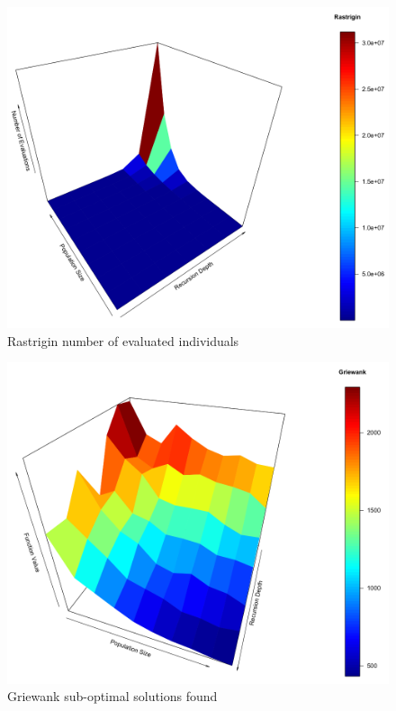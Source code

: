 \documentclass[graybox]{styles/svmult}
\begin{document}
\begin{figure}[b]
\sidecaption
\includegraphics[width=1.0\textwidth]{images/fig05}
\caption{Rastrigin number of evaluated individuals}
\label{fig:12}
\end{figure}

\begin{figure}[b]
\sidecaption
\includegraphics[width=1.0\textwidth]{images/fig06}
\caption{Griewank sub-optimal solutions found}
\label{fig:13}
\end{figure}
\end{document}
